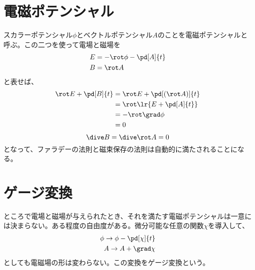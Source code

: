     \section{電磁ポテンシャル}
        スカラーポテンシャル$\phi$とベクトルポテンシャル$A$のことを電磁ポテンシャルと呼ぶ。この二つを使って電場と磁場を
        \begin{align*}
            E &= -\rot \phi - \pd[A]{t}\\
            B &= \rot A
        \end{align*}
        と表せば、
        \begin{align*}
            \rot E + \pd[B]{t}
            &= \rot E + \pd[(\rot A)]{t}\\
            &= \rot \lr{E + \pd[A]{t}}\\
            &= -\rot\grad\phi\\
            &= 0
        \end{align*}
            \[\dive B = \dive\rot A = 0\]
        となって、ファラデーの法則と磁束保存の法則は自動的に満たされることになる。
    \section{ゲージ変換}
        ところで電場と磁場が与えられたとき、それを満たす電磁ポテンシャルは一意には決まらない。ある程度の自由度がある。微分可能な任意の関数$\chi$を導入して、
        \begin{align*}
            \phi \rightarrow \phi - \pd[\chi]{t}\\
            A \rightarrow A + \grad\chi
        \end{align*}
        としても電磁場の形は変わらない。この変換をゲージ変換という。
